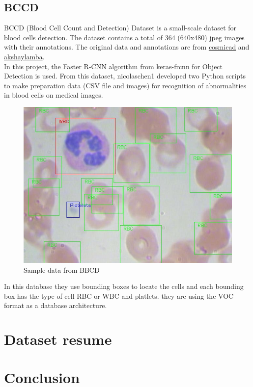 \subsection{BCCD}
BCCD (Blood Cell Count and Detection) Dataset is a small-scale dataset for blood cells detection. The dataset contains a total of 364 (640x480) jpeg images with their annotations. The original data and annotations are from \href{https://github.com/cosmicad/dataset}{cosmicad} and \href{https://github.com/akshaylamba/all_CELL_data}{akshaylamba}.\\
In this project, the Faster R-CNN algorithm from keras-frcnn for Object Detection is used. From this dataset, nicolaschen1 developed two Python scripts to make preparation data (CSV file and images) for recognition of abnormalities in blood cells on medical images.

\begin{figure}[H]
\centering
\includegraphics[width=\linewidth]{../images/BBCD1.jpg}
\caption{Sample data from BBCD}
\label{fig:BBCD1}
\end{figure}

In this database they use bounding boxes to locate the cells and each bounding box has the type of cell RBC or WBC and platlets. they are using the VOC format as a database architecture.

\section{Dataset resume}



\newpage
\section{Conclusion}
\hspace*{0.16in}



\newpage
